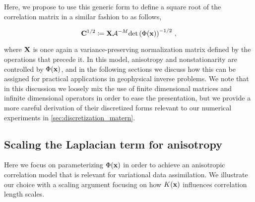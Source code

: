 Here, we propose to use this generic form to define a square root of the
correlation matrix in a similar fashion to
\citet{weaver_correlation_2001, mirouze_representation_2010,
carrier_background-error_2010}
as follows,
\begin{linenomath*}\begin{equation}
    \mathbf{C}^{1/2} \coloneqq \mathbf{X}
    \mathcal{A}^{-M}
    \text{det}\left(\Phi(\mathbf{x})\right)^{-1/2} \, ,
    \label{eq:matern_operator}
\end{equation}\end{linenomath*}
where $\mathbf{X}$ is
once again a variance-preserving normalization matrix defined by the operations
that precede it.
In this model,
anisotropy and nonstationarity are controlled by
$\Phi(\mathbf{x})$, and in the following sections
we discuss how this can be assigned for
practical applications in geophysical inverse problems.
We note that in this discussion we loosely mix the use of
finite dimensional matrices and infinite dimensional operators
in order to ease the presentation, but we provide a more careful
derivation of their discretized forms relevant to our numerical experiments in
\cref{sec:discretization_matern}.

\subsection{Scaling the Laplacian term for anisotropy}
\label{ssec:scaling_laplacian}

Here we focus on parameterizing $\Phi(\mathbf{x})$ in order to achieve an anisotropic
correlation model that is relevant for variational data assimilation.
We illustrate our choice with a scaling argument focusing on how $K(\mathbf{x})$
influences correlation length scales.


